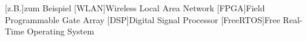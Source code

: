 \documentclass[../EDF Master Thesis.tex]{subfiles}
\begin{document}
    \begin{acronym}[abkuerzungen]
        [z.B.]{zum Beispiel}
        [WLAN]{Wireless Local Area Network}
        [FPGA]{Field Programmable Gate Array}
        [DSP]{Digital Signal Processor}
        [FreeRTOS]{Free Real-Time Operating System}
	\end{acronym}
\end{document}
